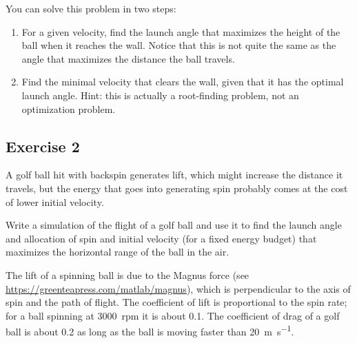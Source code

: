 
You can solve this problem in two steps:

\begin{enumerate}

\item For a given velocity, find the launch angle that maximizes the height of the ball when it reaches the wall.  Notice that this is not quite the same as the angle that maximizes the distance the ball travels.


\item Find the minimal velocity that clears the wall, given that it has the optimal launch angle.  Hint: this is actually a root-finding problem, not an optimization problem.

\end{enumerate}



\subsection{Exercise 2}
\label{golf}


A golf ball hit with backspin generates lift, which might increase the distance it travels, but the energy that goes into generating spin probably comes at the cost of lower initial velocity.

Write a simulation of the flight of a golf ball and use it to find
the launch angle and allocation of spin and initial velocity
(for a fixed energy budget) that maximizes the horizontal range of the
ball in the air.

The lift of a spinning ball is due to the Magnus force (see
\url{https://greenteapress.com/matlab/magnus}), which is
perpendicular to the axis of spin and the path of flight.  The
coefficient of lift is proportional to the spin rate; for a ball
spinning at 3000~rpm it is about 0.1.  The coefficient of drag of a
golf ball is about 0.2 as long as the ball is moving faster than \SI{20}{\meter\per\second}.



